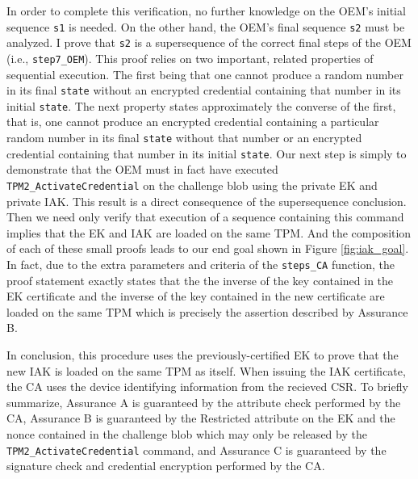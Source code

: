 In order to complete this verification, no further knowledge on the OEM's initial sequence \verb|s1| is needed.
On the other hand, the OEM's final sequence \verb|s2| must be analyzed.
I prove that \verb|s2| is a supersequence of the correct final steps of the OEM (i.e., \verb|step7_OEM|). This proof relies on two important, related properties of sequential execution. The first being that one cannot produce a random number in its final \verb|state| without an encrypted credential containing that number in its initial \verb|state|. The next property states approximately the converse of the first, that is, one cannot produce an encrypted credential containing a particular random number in its final \verb|state| without that number or an encrypted credential containing that number in its initial \verb|state|.
Our next step is simply to demonstrate that the OEM must in fact have executed \verb|TPM2_ActivateCredential| on the challenge blob using the private EK and private IAK. This result is a direct consequence of the supersequence conclusion. Then we need only verify that execution of a sequence containing this command implies that the EK and IAK are loaded on the same TPM. And the composition of each of these small proofs leads to our end goal shown in Figure 
\ref{fig:iak_goal}.
In fact, due to the extra parameters and criteria of the
\verb|steps_CA| function, the proof statement exactly states that the the inverse of the key contained in
the EK certificate and the inverse of the key contained in the new certificate are loaded on the
same TPM which is precisely the assertion described by Assurance B.

In conclusion, this procedure uses the previously-certified EK to prove that the new IAK is
loaded on the same TPM as itself. When issuing the IAK certificate, the CA uses the device identifying information from the recieved CSR. 
To briefly summarize, Assurance A
is guaranteed by the attribute check performed by the CA, Assurance B is guaranteed by the
Restricted attribute on the EK and the nonce contained in the challenge blob which may only be
released by the \verb|TPM2_ActivateCredential| command, and Assurance C is guaranteed by the signature check and credential encryption performed by the CA.






